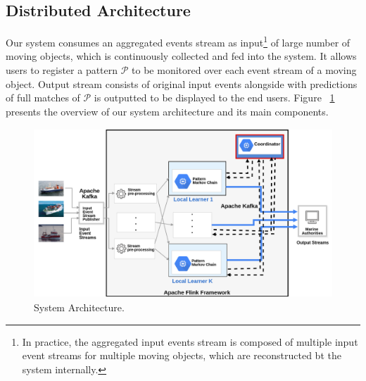 

\subsection{Distributed Architecture}
\label{sec:architecture}
Our system consumes an aggregated events stream as input\footnote{In practice, the aggregated input events stream is composed of multiple input event streams for multiple moving objects, which are reconstructed bt the system internally.} of large number of moving objects, which is continuously collected and fed into the system. It allows users to register a pattern $\mathcal{P}$ to be monitored over each event stream of a moving object. Output stream consists of original input events alongside with predictions of full matches of $\mathcal{P}$ is outputted to be displayed to the end users. Figure ~\ref{fig:architecture} presents the overview of our system architecture and its main components.      


\begin{figure}[h]

\includegraphics[height=2.5in, width=\linewidth]{figures/distributed_architecture.png}
	
\caption{System Architecture.}
\label{fig:architecture}
\end{figure}


